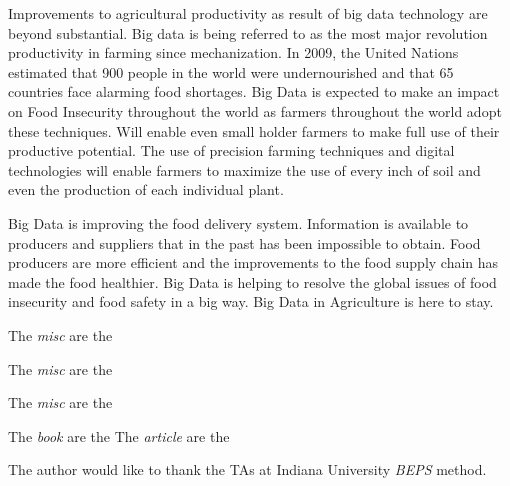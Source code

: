 \documentclass[sigconf]{acmart}
\begin{document}
Improvements to agricultural productivity as result of big data technology are beyond substantial. Big data is being referred to as the most major revolution productivity in farming since mechanization.  In 2009, the United Nations estimated that 900 people in the world were undernourished and that 65 countries face alarming food shortages. Big Data is expected to make an impact on Food Insecurity throughout the world as farmers throughout the world adopt these techniques. Will enable even small holder farmers to make full use of their productive potential. The use of precision farming techniques and digital technologies will enable farmers to maximize the use of every inch of soil and even the production of each individual plant.

Big Data is improving the food delivery system. Information is available to producers and suppliers that in the past has been impossible to obtain. Food producers are more efficient and the improvements to the food supply chain has made the food healthier. Big Data is helping to resolve the global issues of food insecurity and food safety in a big way. Big Data in Agriculture is here to stay. 

 \cite{vanGundy09}
The \textit{misc} are the \cite{www-google}

The \textit{misc} are the \cite{www-google1}

The \textit{misc} are the \cite{www-google2}

The \textit{book} are the \cite{book}
The \textit{article} are the \cite{article1}
\begin{acks}

  The author would like to thank the TAs at Indiana University \textit{BEPS} method.

\end{acks}


 
\end{document}

